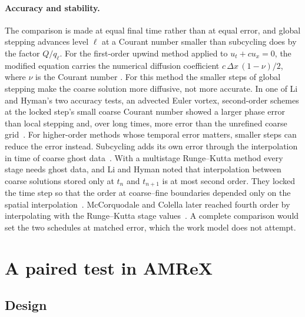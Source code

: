 \documentclass[12pt]{article}
\theoremstyle{remark}
\begin{document}
\paragraph{Accuracy and stability.}
The comparison is made at equal final time rather than at equal error, and global stepping advances level $\ell$ at a Courant number smaller than subcycling does by the factor $Q/q_\ell$. For the first-order upwind method applied to $u_t+cu_x=0$, the modified equation carries the numerical diffusion coefficient $c\,\Delta x\,(1-\nu)/2$, where $\nu$ is the Courant number \cite[Sec.~8.6]{leveque2002finite}. For this method the smaller steps of global stepping make the coarse solution more diffusive, not more accurate. In one of Li and Hyman's two accuracy tests, an advected Euler vortex, second-order schemes at the locked step's small coarse Courant number showed a larger phase error than local stepping and, over long times, more error than the unrefined coarse grid~\cite{li2006local}. For higher-order methods whose temporal error matters, smaller steps can reduce the error instead. Subcycling adds its own error through the interpolation in time of coarse ghost data~\cite{stone2020athena}. With a multistage Runge--Kutta method every stage needs ghost data, and Li and Hyman noted that interpolation between coarse solutions stored only at $t_n$ and $t_{n+1}$ is at most second order. They locked the time step so that the order at coarse--fine boundaries depended only on the spatial interpolation~\cite{li2003adaptive}. McCorquodale and Colella later reached fourth order by interpolating with the Runge--Kutta stage values~\cite{mccorquodale2011high}. A complete comparison would set the two schedules at matched error, which the work model does not attempt.

\section{A paired test in AMReX}\label{sec:amrex}

\subsection{Design}\label{sec:design}
\end{document}
